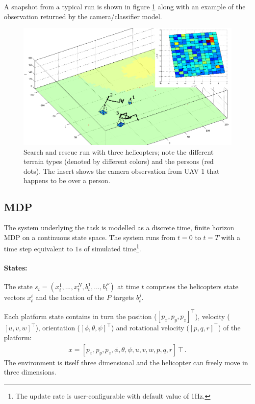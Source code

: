 \documentclass[a4paper,11pt]{report}
\begin{document}
A snapshot from a typical run is shown in figure \ref{fig:searchrescue} along with an example of the observation returned by the camera/classifier model.
\begin{figure}[ht]
\centering
\includegraphics[width=15cm]{fig/searchrescue.jpg}
\caption{Search and rescue run with three helicopters; note the different terrain types (denoted by different colors) and the persons (red dots). The insert shows the camera observation from UAV 1 that happens to be over a person. \label{fig:searchrescue}}
\end{figure}

\subsection{MDP}
The system underlying the task is modelled as a discrete time, finite horizon MDP on a continuous state space. The system runs from $t=0$ to $t=T$ with a time step equivalent to $1s$ of simulated time\footnote{The update rate is user-configurable with default value of 1Hz.}.

\paragraph{States:} The state $s_t=(x^1_t,...,x^{N}_t,b^1_t,...,b^P_t)$ at time $t$ comprises the helicopters state vectors $x^i_t$ and the location of the $P$ targets $b^j_t$.

Each platform state contains in turn the position ($[p_x,p_y,p_z]^\intercal$), velocity ($[u,v,w]^\intercal$), orientation ($[\phi,\theta,\psi]^\intercal$) and rotational velocity ($[p,q,r]^\intercal$) of the platform:
\begin{align}
x = [p_x,p_y,p_z,\phi,\theta,\psi,u,v,w,p,q,r]\intercal .
\end{align} 
The environment is itself three dimensional and the helicopter can freely move in three dimensions.
\end{document}
